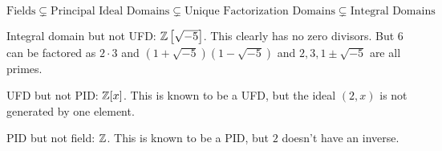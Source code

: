 \begin{sol}
$$\text{Fields} \subsetneq \text{Principal Ideal Domains}\subsetneq \text{Unique Factorization Domains}\subsetneq \text{Integral Domains}$$

Integral domain but not UFD: $\mathbb{Z}\left[\sqrt{-5}\right]$. This clearly has no zero divisors. But $6$ can be factored as $2\cdot 3$ and $\left(1+\sqrt{-5}\right)\left(1-\sqrt{-5}\right)$ and $2,3,1\pm\sqrt{-5}$ are all primes. 

UFD but not PID: $\mathbb{Z}[x]$. This is known to be a UFD, but the ideal $(2,x)$ is not generated by one element.

PID but not field: $\mathbb{Z}$. This is known to be a PID, but $2$ doesn't have an inverse.
\end{sol}